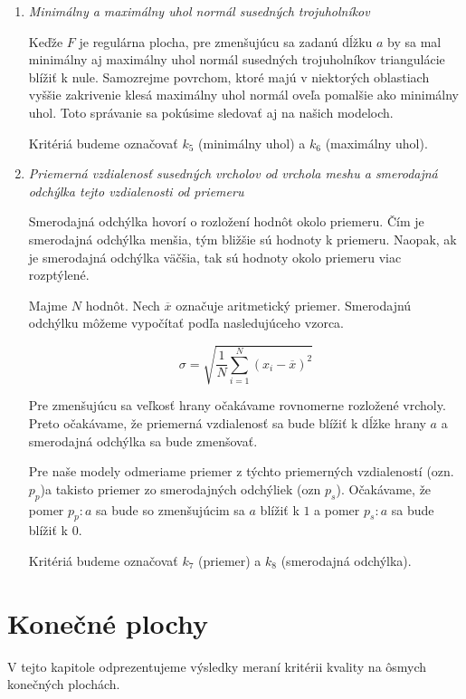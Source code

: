 \begin{enumerate}
{    Kritérium budeme označovať $k_4$.
}
\item{
    \textit{Minimálny a maximálny uhol normál susedných trojuholníkov}

    Keďže $F$ je regulárna plocha, pre zmenšujúcu sa zadanú dĺžku $a$ by sa mal minimálny aj maximálny 
    uhol normál susedných trojuholníkov triangulácie blížiť k nule. Samozrejme povrchom, ktoré majú 
    v niektorých oblastiach vyššie zakrivenie klesá maximálny uhol normál oveľa pomalšie ako minimálny
    uhol. Toto správanie sa pokúsime sledovať aj na našich modeloch.

    Kritériá budeme označovať $k_5$ (minimálny uhol) a $k_6$ (maximálny uhol).
}
\item{
    \textit{Priemerná vzdialenosť susedných vrcholov od vrchola meshu a smerodajná odchýlka tejto vzdialenosti od priemeru}

    Smerodajná odchýlka hovorí o rozložení hodnôt okolo priemeru. Čím je smerodajná odchýlka menšia, 
    tým bližšie sú hodnoty k priemeru. Naopak, ak je smerodajná odchýlka väčšia, tak sú hodnoty okolo
    priemeru viac rozptýlené.
    
    Majme $N$ hodnôt. Nech $\overline{x}$ označuje aritmetický priemer. 
    Smerodajnú odchýlku môžeme vypočítať podľa nasledujúceho vzorca.

    \begin{equation}
    \label{eq:std}
    \sigma = \sqrt{\frac{1}{N} \sum\limits_{i=1}^{N}(x_i - \overline{x})^2} 
    \end{equation}

    Pre zmenšujúcu sa veľkosť hrany očakávame rovnomerne rozložené vrcholy. Preto očakávame, že 
    priemerná vzdialenosť sa bude blížiť k dĺžke hrany $a$ a smerodajná odchýlka sa bude zmenšovať.
    
    Pre naše modely odmeriame priemer z týchto priemerných vzdialeností (ozn. $p_p$)a takisto priemer 
    zo smerodajných odchýliek (ozn $p_s$). Očakávame, že pomer $p_p : a$ sa bude so zmenšujúcim sa $a$
    blížiť k $1$ a pomer $p_s : a$ sa bude blížiť k $0$.

    Kritériá budeme označovať $k_7$ (priemer) a $k_8$ (smerodajná odchýlka).
}
\end{enumerate}

\section{Konečné plochy}

V tejto kapitole odprezentujeme výsledky meraní kritérii kvality na ôsmych konečných plochách.

